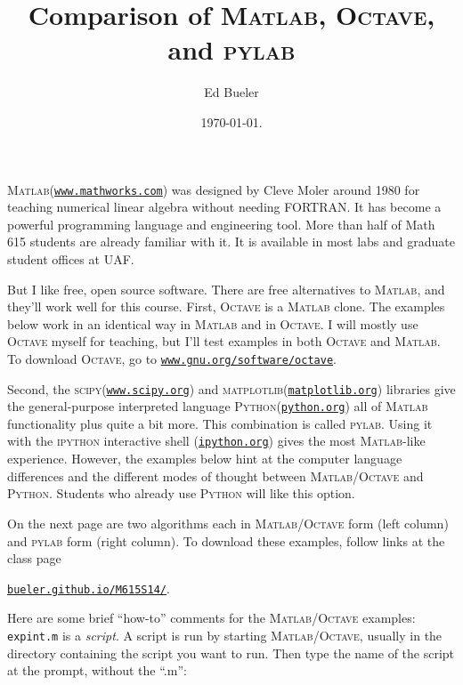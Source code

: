 \documentclass[11pt]{amsart}
\newcommand{\Matlab}{\textsc{Matlab}\xspace}
\newcommand{\Octave}{\textsc{Octave}\xspace}
\newcommand{\python}{\textsc{Python}\xspace}
\newcommand{\pylab}{\textsc{pylab}\xspace}
\newcommand{\scipy}{\textsc{scipy}\xspace}
\newcommand{\matplotlib}{\textsc{matplotlib}\xspace}
\begin{document}
\title{Comparison of \textsc{Matlab}, \textsc{Octave}, and \textsc{pylab}}

\author{Ed Bueler}

\date{\today.}

\maketitle
\normalsize
\thispagestyle{empty}

\newcommand{\hrf}[2]{\href{#1}{\texttt{#2}}}

\Matlab (\hrf{http://www.mathworks.com/}{www.mathworks.com}) was designed by Cleve Moler around 1980 for teaching numerical linear algebra without needing FORTRAN.  It has become a powerful programming language and engineering tool.  More than half of Math 615 students are already familiar with it.  It is available in most labs and graduate student offices at UAF.

But I like free, open source software.  There are free alternatives to \Matlab, and they'll work well for this course.  First, \Octave is a \Matlab clone.  The examples below work in an identical way in \Matlab and in \Octave.  I will mostly use \Octave myself for teaching, but I'll test examples in both \Octave and \Matlab.  To download \Octave, go to 
\hrf{http://www.gnu.org/software/octave/}{www.gnu.org/software/octave}.

Second, the \scipy (\hrf{http://www.scipy.org/}{www.scipy.org}) and \matplotlib (\hrf{http://matplotlib.org/}{matplotlib.org}) libraries give the general-purpose interpreted language \python (\hrf{http://python.org/}{python.org}) all of \Matlab functionality plus quite a bit more.  This combination is called \pylab.  Using it with the \textsc{ipython} interactive shell (\hrf{http://ipython.org/}{ipython.org}) gives the most \Matlab-like experience.  However, the examples below hint at the computer language differences and the different modes of thought between \Matlab/\Octave and \python.  Students who already use \python will like this option.

On the next page are two algorithms each in \Matlab/\Octave form (left column) and \pylab form (right column).  To download these examples, follow links at the class page

\centerline{\hrf{http://bueler.github.io/M615S14/}{bueler.github.io/M615S14/}.}

Here are some brief ``how-to'' comments for the \Matlab/\Octave examples: \texttt{expint.m} is a \emph{script}.  A script is run by starting \Matlab/\Octave, usually in the directory containing the script you want to run.  Then type the name of the script at the prompt, without the ``.m'':
\end{document}
